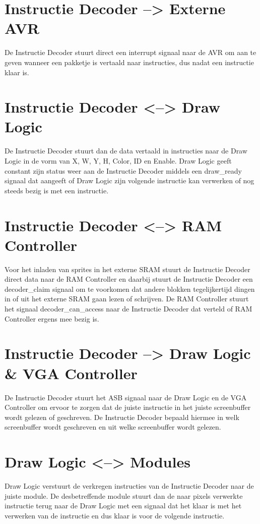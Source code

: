 \documentclass{scrartcl} %
\begin{document}
\section{Instructie Decoder --> Externe AVR}
De Instructie Decoder stuurt direct een interrupt signaal naar de AVR om aan te geven wanneer een pakketje is vertaald naar instructies, dus nadat een instructie klaar is.

\section{Instructie Decoder <--> Draw Logic}
De Instructie Decoder stuurt dan de data vertaald in instructies naar de Draw Logic in de vorm van X, W, Y, H, Color, ID en Enable. Draw Logic geeft constant zijn status weer aan de Instructie Decoder middels een draw\_ready signaal dat aangeeft of Draw Logic zijn volgende instructie kan verwerken of nog steeds bezig is met een instructie.

\section {Instructie Decoder <--> RAM Controller}
Voor het inladen van sprites in het externe SRAM stuurt de Instructie Decoder direct data naar de RAM Controller en daarbij stuurt de Instructie Decoder een decoder\_claim signaal om te voorkomen dat andere blokken tegelijkertijd dingen in of uit het externe SRAM gaan lezen of schrijven. De RAM Controller stuurt het signaal decoder\_can\_access naar de Instructie Decoder dat verteld of RAM Controller ergens mee bezig is.

\section {Instructie Decoder --> Draw Logic \& VGA Controller}
De Instructie Decoder stuurt het ASB signaal naar de Draw Logic en de VGA Controller om ervoor te zorgen dat de juiste instructie in het juiste screenbuffer wordt gelezen of geschreven. De Instructie Decoder bepaald hiermee in welk screenbuffer wordt geschreven en uit welke screenbuffer wordt gelezen.

\section {Draw Logic <--> Modules}
Draw Logic verstuurt de verkregen instructies van de Instructie Decoder naar de juiste module. De desbetreffende module stuurt dan de naar pixels verwerkte instructie terug naar de Draw Logic met een signaal dat het klaar is met het verwerken van de instructie en dus klaar is voor de volgende instructie.
\end{document}
